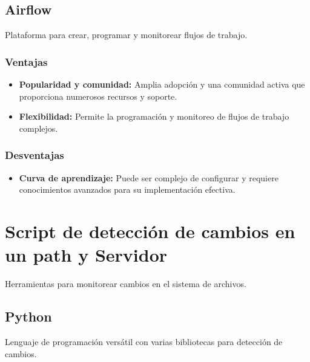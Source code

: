 \subsection{Airflow}
Plataforma para crear, programar y monitorear flujos de trabajo.

\subsubsection{Ventajas}
\begin{itemize}
    \item \textbf{Popularidad y comunidad:} Amplia adopción y una comunidad activa que proporciona numerosos recursos y soporte.
    
    \item \textbf{Flexibilidad:} Permite la programación y monitoreo de flujos de trabajo complejos.
\end{itemize}

\subsubsection{Desventajas}
\begin{itemize}
    \item \textbf{Curva de aprendizaje:} Puede ser complejo de configurar y requiere conocimientos avanzados para su implementación efectiva.
\end{itemize}

\clearpage
\section{Script de detección de cambios en un path y Servidor}
Herramientas para monitorear cambios en el sistema de archivos.

\subsection{Python}
Lenguaje de programación versátil con varias bibliotecas para detección de cambios.

